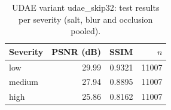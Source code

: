 \begin{table}[t]
\centering
\caption{UDAE variant udae_skip32: test results per severity (salt, blur and occlusion pooled).}
\label{tab:task1_by_level}
\begin{tabular}{lrrr}
\toprule
Severity & PSNR (dB) & SSIM & $n$ \\
\midrule
low & 29.99 & 0.9321 & 11007 \\
medium & 27.94 & 0.8895 & 11007 \\
high & 25.86 & 0.8162 & 11007 \\
\bottomrule
\end{tabular}
\end{table}

